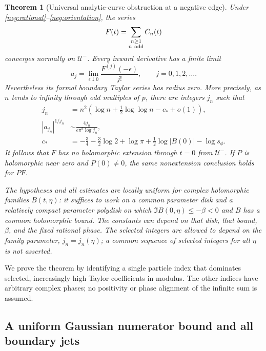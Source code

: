 \documentclass[11pt]{article}
\numberwithin{equation}{section}
\newtheorem{theorem}{Theorem}[section]
\theoremstyle{definition}
\begin{document}
\begin{theorem}[Universal analytic-curve obstruction at a negative edge]
\label{neg:theorem}
Under \eqref{neg:rational}--\eqref{neg:orientation}, the series
\[
 F(t)=\sum_{\substack{n\ge1\\n\ {\rm odd}}}C_n(t)
 \]
converges normally on \(\mathcal U^-\).  Every inward derivative has
a finite limit
\begin{equation}
 a_j=\lim_{\epsilon\downarrow0}\frac{F^{(j)}(-\epsilon)}{j!},
 \qquad j=0,1,2,\ldots .
 \label{neg:jets}
\end{equation}
Nevertheless its formal boundary Taylor series has radius zero.
More precisely, as \(n\) tends to infinity through odd multiples of
\(p\), there are integers \(j_n\) such that
\begin{align}
 j_n&=n^2\left(\log n+\tfrac12\log\log n-c_*+o(1)\right),
 \label{neg:jn-statement}\\
 |a_{j_n}|^{1/j_n}
   &\sim \frac{4j_n}{e\pi^2\log j_n},
 \label{neg:growth-statement}\\
 c_*&=-\frac34-\frac32\log2+\log\pi
            +\frac12\log|B(0)|-\log s_\phi .
 \label{neg:cstar}
\end{align}
It follows that \(F\) has no holomorphic extension through \(t=0\)
from \(\mathcal U^-\).  If \(P\) is holomorphic near zero and
\(P(0)\ne0\), the same nonextension conclusion holds for \(P F\).

The hypotheses and all estimates are locally uniform for complex
holomorphic families \(B(t,\eta)\): it suffices to work on a common
parameter disk and a relatively compact parameter polydisk on which
\(\Im B(0,\eta)\le-\beta<0\) and \(B\) has a common holomorphic bound.
The constants can depend on that disk, that bound, \(\beta\), and the
 fixed rational phase.  The selected integers are allowed to depend
 on the family parameter, \(j_n=j_n(\eta)\); a common sequence of
 selected integers for all \(\eta\) is not asserted.
\end{theorem}

We prove the theorem by identifying a single particle index that
dominates selected, increasingly high Taylor coefficients in modulus.
The other indices have arbitrary complex phases; no positivity or
phase alignment of the infinite sum is assumed.

\subsection{A uniform Gaussian numerator bound and all boundary jets}
\label{neg:jets-section}
\end{document}
